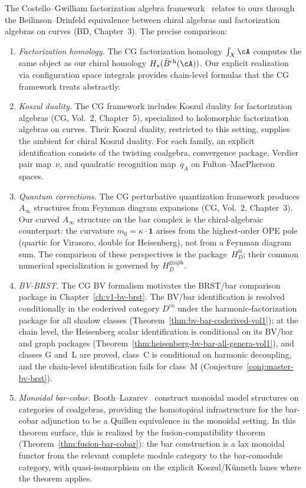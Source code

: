 \begin{remark}\label{rem:cg-comparison}
The Costello--Gwilliam factorization algebra framework~\cite{CG17}
relates to ours through the Beilinson--Drinfeld equivalence between
chiral algebras and factorization algebras on curves (BD, Chapter~3).
The precise comparison:
\begin{enumerate}[label=(\roman*)]
\item \emph{Factorization homology.}
 The CG factorization homology $\int_X \cA$ computes the same object
 as our chiral homology $H_*(\bar{B}^{\mathrm{ch}}(\cA))$. Our explicit
 realization via configuration space integrals provides chain-level
 formulas that the CG framework treats abstractly.
\item \emph{Koszul duality.}
 The CG framework includes Koszul duality for factorization algebras
 (CG, Vol.~2, Chapter~5), specialized to holomorphic factorization
 algebras on curves. Their Koszul duality, restricted to this setting,
 supplies the ambient for chiral Koszul duality.  For each family, an
 explicit identification consists of the twisting coalgebra,
 convergence package, Verdier pair map~$\nu$, and quadratic
 recognition map~$q_A$ on Fulton--MacPherson spaces.
\item \emph{Quantum corrections.}
 The CG perturbative quantization framework produces $A_\infty$
 structures from Feynman diagram expansions (CG, Vol.~2, Chapter~3).
 Our curved $A_\infty$ structure on the bar complex is the
 chiral-algebraic counterpart: the curvature $m_0 = \kappa \cdot
 \mathbf{1}$ arises from the highest-order OPE pole (quartic for
 Virasoro, double for Heisenberg), not from a Feynman diagram sum.
 The comparison of these perspectives is the package~$H_D^{\mathrm{tr}}$;
 their common numerical specialization is governed by
 $H_D^{\mathrm{graph}}$.
\item \emph{BV-BRST.}
The CG BV formalism motivates the BRST/bar comparison package in
Chapter~\ref{ch:v1-bv-brst}. The BV/bar identification is resolved
conditionally in the coderived category $D^{\mathrm{co}}$ under the
harmonic-factorization package for all shadow classes
(Theorem~\ref{thm:bv-bar-coderived-vol1}); at the chain level, the
Heisenberg scalar identification is conditional on its BV/bar and
graph packages
(Theorem~\ref{thm:heisenberg-bv-bar-all-genera-vol1}), and classes
G and~L are proved, class~C is conditional on harmonic decoupling,
and the chain-level identification fails for class~M
(Conjecture~\ref{conj:master-bv-brst}).
\item \emph{Monoidal bar-cobar.}
 Booth--Lazarev~\cite{BL24} construct monoidal model structures on
 categories of coalgebras, providing the homotopical infrastructure
 for the bar-cobar adjunction to be a Quillen equivalence in the
 monoidal setting. In this theorem surface, this is realized by the
 fusion-compatibility theorem
 (Theorem~\ref{thm:fusion-bar-cobar}): the bar construction
 is a lax monoidal functor from the relevant complete module
 category to the bar-comodule category, with quasi-isomorphism on the
 explicit Koszul/K\"unneth lanes where the theorem applies.
\end{enumerate}
\end{remark}


